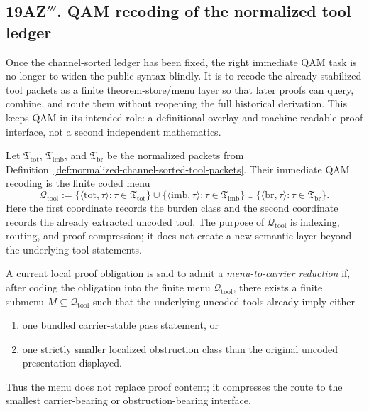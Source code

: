 \subsection*{19AZ$'''$. QAM recoding of the normalized tool ledger}
\label{sec:qam-recoding-normalized-tool-ledger}
Once the channel-sorted ledger has been fixed, the right immediate QAM task is no longer to widen the public syntax blindly. It is to recode the already stabilized tool packets as a finite theorem-store/menu layer so that later proofs can query, combine, and route them without reopening the full historical derivation. This keeps QAM in its intended role: a definitional overlay and machine-readable proof interface, not a second independent mathematics.

\begin{definition}
\label{def:qam-coded-tool-menu}
Let \(\mathfrak T_{\mathrm{tot}}\), \(\mathfrak T_{\mathrm{imb}}\), and \(\mathfrak T_{\mathrm{br}}\) be the normalized packets from Definition~\ref{def:normalized-channel-sorted-tool-packets}. Their immediate QAM recoding is the finite coded menu
\[
\mathcal Q_{\mathrm{tool}}
:=
\bigl\{\langle \mathrm{tot},\tau\rangle : \tau\in\mathfrak T_{\mathrm{tot}}\bigr\}
\cup
\bigl\{\langle \mathrm{imb},\tau\rangle : \tau\in\mathfrak T_{\mathrm{imb}}\bigr\}
\cup
\bigl\{\langle \mathrm{br},\tau\rangle : \tau\in\mathfrak T_{\mathrm{br}}\bigr\}.
\]
Here the first coordinate records the burden class and the second coordinate records the already extracted uncoded tool. The purpose of \(\mathcal Q_{\mathrm{tool}}\) is indexing, routing, and proof compression; it does not create a new semantic layer beyond the underlying tool statements.
\end{definition}

\begin{definition}
\label{def:menu-to-carrier-reduction}
A current local proof obligation is said to admit a \emph{menu-to-carrier reduction} if, after coding the obligation into the finite menu \(\mathcal Q_{\mathrm{tool}}\), there exists a finite submenu \(M\subseteq \mathcal Q_{\mathrm{tool}}\) such that the underlying uncoded tools already imply either
\begin{enumerate}[leftmargin=2em]
 \item one bundled carrier-stable pass statement, or
 \item one strictly smaller localized obstruction class than the original uncoded presentation displayed.
\end{enumerate}
Thus the menu does not replace proof content; it compresses the route to the smallest carrier-bearing or obstruction-bearing interface.
\end{definition}


